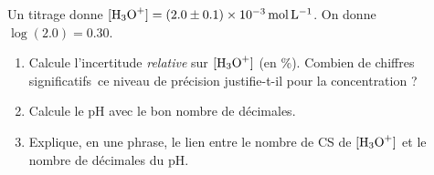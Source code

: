 \documentclass[11pt,a4paper]{article}
\newcommand{\CS}{chiffres significatifs}
\begin{document}
\begin{exo}
Un titrage donne $[\ce{H3O+}]=(\num{2,0}\pm\num{0,1})\times10^{-3}\,\si{\mol\per\litre}$. On donne
$\log(\num{2,0})=\num{0,30}$.
\begin{enumerate}[label=\alph*),leftmargin=1.6em,itemsep=1pt]
  \item Calcule l'incertitude \emph{relative} sur $[\ce{H3O+}]$ (en \%). Combien de \CS\ ce niveau de
        précision justifie-t-il pour la concentration ?
  \item Calcule le pH avec le bon nombre de décimales.
  \item Explique, en une phrase, le lien entre le nombre de CS de $[\ce{H3O+}]$ et le nombre de
        décimales du pH.
\end{enumerate}
\end{exo}
\end{document}
